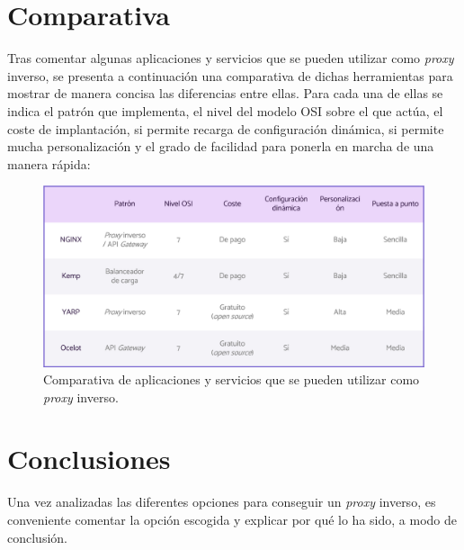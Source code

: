 \documentclass[11pt,spanish,listoffigures]{tfgetsinf}
\begin{document}
\newpage %


	\section{Comparativa}

Tras comentar algunas aplicaciones y servicios que se pueden utilizar como \emph{proxy} inverso, se presenta a continuación una comparativa de dichas herramientas para mostrar de manera concisa las diferencias entre ellas. Para cada una de ellas se indica el patrón que implementa, el nivel del modelo OSI sobre el que actúa, el coste de implantación, si permite recarga de configuración dinámica, si permite mucha personalización y el grado de facilidad para ponerla en marcha de una manera rápida:

\begin{figure}[ht]
\centering
\includegraphics[width=1\textwidth]{imagenes/comparativaEstadoDelArte}
\caption{Comparativa de aplicaciones y servicios que se pueden utilizar como \emph{proxy} inverso.}
\end{figure}


	\section{Conclusiones}

Una vez analizadas las diferentes opciones para conseguir un \emph{proxy} inverso, es conveniente comentar la opción escogida y explicar por qué lo ha sido, a modo de conclusión.
\end{document}
